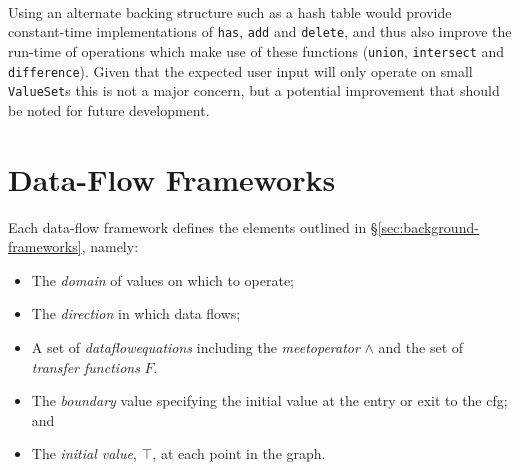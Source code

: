 \documentclass[bsc,twoside,singlespacing,parskip,logo,notimes,normalheadings]{infthesis}
\begin{document}
    \begin{table}[!ht]
      \centering
      \def\arraystretch{1.2}
      \\[2mm]
    \end{table}

    Using an alternate backing structure such as a hash table would
    provide constant-time implementations of {\tt has}, {\tt add} and
    {\tt delete}, and thus also improve the run-time of operations
    which make use of these functions ({\tt union}, {\tt intersect}
    and {\tt difference}). Given that the expected user input will
    only operate on small {\tt ValueSet}s this is not a major concern,
    but a potential improvement that should be noted for future
    development.
    
    \section{Data-Flow Frameworks}
    
    Each data-flow framework defines the elements outlined in
    \S\ref{sec:background-frameworks}, namely:

    \begin{itemize}
    \item The {\em \gls{domain}} of values on which to operate;
    \item The {\em \gls{direction}} in which data flows;
    \item A set of {\em \gls{dataflowequations}} including the {\em
        \gls{meetoperator}} $\land$ and the set of {\em
        \gls{transfer} functions} $F$.
    \item The {\em \gls{boundary}} value specifying the initial value
      at the entry or exit to the \gls{cfg}; and
    \item The {\em initial value}, $\top$, at each point in the graph.
    \end{itemize}
\end{document}
